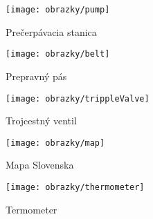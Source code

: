 \begin{figure}[H]
	\centering
	\texttt{[image: obrazky/pump]}
	\caption{Prečerpávacia stanica}
	\label{fig:pump}
\end{figure}
\begin{figure}[H]
	\centering
	\texttt{[image: obrazky/belt]}
	\caption{Prepravný pás}
	\label{fig:belt}
\end{figure}
\begin{figure}[H]
	\centering
	\texttt{[image: obrazky/trippleValve]}
	\caption{Trojcestný ventil}
	\label{fig:trippleValve}
\end{figure}
\begin{figure}[H]
	\centering
	\texttt{[image: obrazky/map]}
	\caption{Mapa Slovenska}
	\label{fig:map}
\end{figure}
\begin{figure}[H]
	\centering
	\texttt{[image: obrazky/thermometer]}
	\caption{Termometer}
	\label{fig:thermometer}
\end{figure}